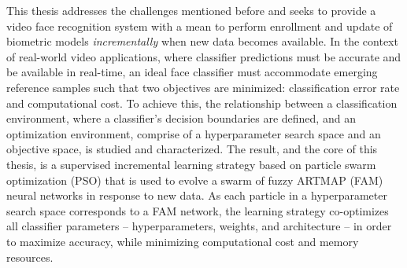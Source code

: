 This thesis addresses the challenges mentioned before and seeks to provide a video face recognition system with a mean to perform enrollment and update of biometric models \emph{incrementally} when new data becomes available.
In the context of real-world video applications, where classifier predictions must be accurate and be available in real-time, an ideal face classifier must accommodate emerging reference samples such that  two objectives are minimized: classification error rate and computational cost.
To achieve this, the relationship between a classification environment, where a classifier's decision boundaries are defined, and an optimization environment, comprise of a hyperparameter search space and an objective space, is studied and characterized.
The result, and the core of this thesis, is a supervised incremental learning strategy based on particle swarm optimization (PSO) that is used to evolve a swarm of fuzzy ARTMAP (FAM) neural networks in response to new data.
As each particle in a hyperparameter search space corresponds to a FAM network, the learning strategy co-optimizes all classifier parameters -- hyperparameters, weights, and architecture -- in order to maximize accuracy, while minimizing computational cost and memory resources.

